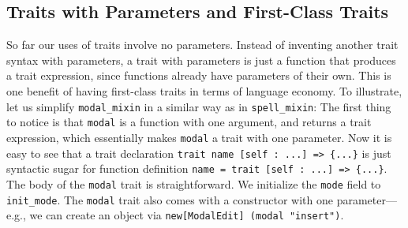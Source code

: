




\subsection{Traits with Parameters and First-Class Traits}

\label{subsec:cons}

So far our uses of traits involve no parameters. Instead of inventing another trait
syntax with parameters, a trait with parameters is just a function that produces
a trait expression, since functions already have parameters of their own. This
is one benefit of having first-class traits in terms of language economy. To
illustrate, let us simplify \lstinline{modal_mixin} in a similar way as in \lstinline{spell_mixin}:
The first thing to notice is that \lstinline{modal} is a function with one
argument, and returns a trait expression, which essentially makes
\lstinline{modal} a trait with one parameter.
Now it is easy to see that a trait declaration
\lstinline$trait name [self : ...] => {...}$ is just syntactic sugar for
function definition \lstinline$name = trait [self : ...] => {...}$. The body of
the \lstinline{modal} trait is straightforward. We initialize the
\lstinline{mode} field to \lstinline{init_mode}.
The \lstinline{modal} trait also comes with a constructor with one parameter---e.g., we can create an object via \lstinline{new[ModalEdit] (modal "insert")}.

